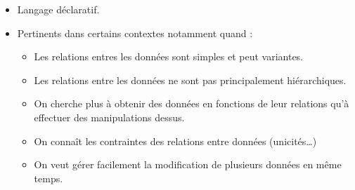 \begin{slide}
	\begin{itemize}
				\item Langage déclaratif.
				\item Pertinents dans certains contextes notamment quand :
				\begin{itemize}
					\item Les relations entres les données sont simples et peut variantes.
					\item Les relations entre les données ne sont pas principalement hiérarchiques.
					\item On cherche plus à obtenir des données en fonctions de leur relations qu'à effectuer des manipulations dessus.
					\item On connaît les contraintes des relations entre données (unicités…)
					\item On veut gérer facilement la modification de plusieurs données en même temps.
				\end{itemize}
	\end{itemize}
	
\end{slide}
